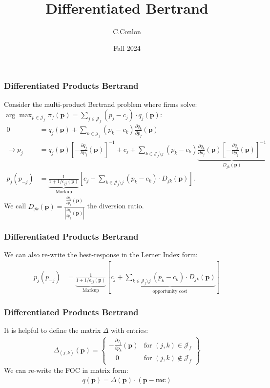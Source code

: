 

\title{Differentiated Bertrand}
\author{C.Conlon}
\date{Fall 2024}


\frame{\titlepage}

\begin{frame}
\frametitle{Differentiated Products Bertrand}
\small
Consider the multi-product Bertrand problem where firms solve: $\arg \max_{p \in \mathcal{J}_f} \pi_f (\mathbf{p}) = \sum_{j \in \mathcal{J}_f} (p_j - c_j) \cdot q_j(\mathbf{p})$:
\begin{align*}
 0&= q_j(\mathbf{p}) + \sum_{k \in \mathcal{J}_f} (p_k - c_k) \frac{\partial q_{k}}{\partial p_j}(\mathbf{p}) \\
\rightarrow p_j &=q_{j}(\mathbf{p}) \left[-\frac{\partial q_{j}}{\partial p_{j}}(\mathbf{p})\right]^{-1} + c_{j} + \sum_{k \in \mathcal{J}_{f} \setminus j} \left(p_{k}-c_{k}\right) \underbrace{\frac{\partial q_{k}}{\partial p_{j}}(\mathbf{p})\left[-\frac{\partial q_{j}}{\partial p_{j}}(\mathbf{p})\right]^{-1}}_{D_{jk}(\mathbf{p})}\\
p_j(p_{-j}) &= \underbrace{\frac{1}{1+1/\epsilon_{jj}(\mathbf{p})}}_{\text{Markup}} \left[ c_j + \sum_{k \in \mathcal{J}_{f} \setminus j}  (p_k-c_k) \cdot  D_{jk} (\mathbf{p}) \right].
\end{align*}
We call $D_{jk}(\mathbf{p}) = \frac{\frac{\partial q_{k}}{\partial p_j}(\mathbf{p})}{\left| \frac{\partial q_{j}}{\partial p_j}(\mathbf{p}) \right|}$ the \alert{diversion ratio}.
\end{frame}

\begin{frame}
\frametitle{Differentiated Products Bertrand}
We can also re-write the best-response in the Lerner Index form:
\begin{align*}
p_j(p_{-j}) &= \underbrace{\frac{1}{1+1/\epsilon_{jj}(\mathbf{p})}}_{\text{Markup}} \left[c_j + \underbrace{\sum_{k \in \mathcal{J}_{f} \setminus j}  (p_k-c_k) \cdot  D_{jk} (\mathbf{p}) }_{\text{opportunity cost}}\right]
\end{align*}

\end{frame}


\begin{frame}
\frametitle{Differentiated Products Bertrand}
It is helpful to define the matrix $\Delta$ with entries:
\begin{eqnarray*}
\Delta_{(j,k)}(\mathbf{p}) = \left\{\begin{array}{lr}
         - \frac{\partial q_{j}}{\partial p_k}(\mathbf{p}) & \text{for }  (j,k) \in \mathcal{J}_f\\
       	  \quad 0 & \text{for } (j,k) \notin \mathcal{J}_f
        \end{array} \right\}
\end{eqnarray*}
We can re-write the FOC in matrix form:
\begin{eqnarray*}
q(\mathbf{p}) = \Delta(\mathbf{p})\cdot(\mathbf{p}-\mathbf{mc})
\end{eqnarray*}
\end{frame}


